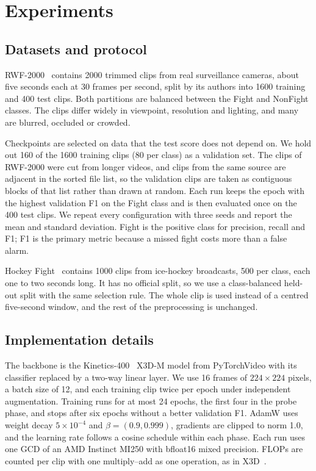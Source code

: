 \documentclass[conference]{IEEEtran}
\begin{document}
\section{Experiments}
\label{sec:exp}

\subsection{Datasets and protocol}

RWF-2000~\cite{rwf2000} contains 2000 trimmed clips from real
surveillance cameras, about five seconds each at 30 frames per second,
split by its authors into 1600 training and 400 test clips. Both
partitions are balanced between the Fight and NonFight classes. The
clips differ widely in viewpoint, resolution and lighting, and many are
blurred, occluded or crowded.

Checkpoints are selected on data that the test score does not depend on.
We hold out 160 of the 1600 training clips (80 per class) as a
validation set. The clips of RWF-2000 were cut from longer videos, and
clips from the same source are adjacent in the sorted file list, so the
validation clips are taken as contiguous blocks of that list rather than
drawn at random. Each run keeps the epoch with the highest validation F1
on the Fight class and is then evaluated once on the 400 test clips. We
repeat every configuration with three seeds and report the mean and
standard deviation. Fight is the positive class for precision, recall
and F1; F1 is the primary metric because a missed fight costs more than
a false alarm.

Hockey Fight~\cite{hockey} contains 1000 clips from ice-hockey
broadcasts, 500 per class, each one to two seconds long. It has no
official split, so we use a class-balanced held-out split with the same
selection rule. The whole clip is used instead of a centred five-second
window, and the rest of the preprocessing is unchanged.

\subsection{Implementation details}

The backbone is the Kinetics-400~\cite{kinetics} X3D-M model from
PyTorchVideo with its classifier replaced by a two-way linear layer. We
use 16 frames of $224 \times 224$ pixels, a batch size of 12, and each
training clip twice per epoch under independent augmentation. Training
runs for at most 24 epochs, the first four in the probe phase, and stops
after six epochs without a better validation F1. AdamW uses weight decay
$5 \times 10^{-4}$ and $\beta = (0.9, 0.999)$, gradients are clipped to
norm 1.0, and the learning rate follows a cosine schedule within each
phase. Each run uses one GCD of an AMD Instinct MI250 with bfloat16
mixed precision. FLOPs are counted per clip with one multiply--add as one
operation, as in X3D~\cite{x3d}.
\end{document}

